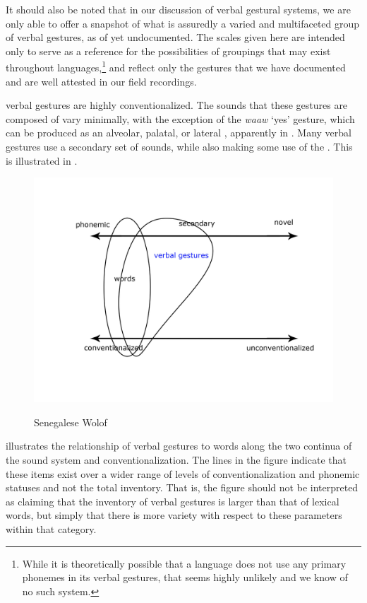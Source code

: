 \documentclass[output=paper
,newtxmath
,modfonts
,nonflat]{langsci/langscibook}
\begin{document}
It should also be noted that in our discussion of verbal gestural systems, we are only able to offer a snapshot of what is  assuredly a varied and multifaceted group of verbal gestures, as of yet undocumented. The scales given here are intended only to serve as a reference for the possibilities of groupings that may exist throughout languages,\footnote{While it is theoretically possible that a language does not use any primary phonemes in its verbal gestures,  that seems highly unlikely and we know of no such system.} and reflect only the gestures that we have documented and are well attested in our field recordings. 

 verbal gestures are highly conventionalized. The sounds that these gestures are composed of vary minimally, with the exception of the \textit{waaw} `yes' gesture, which can be produced as an alveolar, palatal, or lateral , apparently in . Many  verbal gestures use a secondary set of sounds, while also making some use of the . This is illustrated in .  
	
\begin{figure}  
\includegraphics[scale=0.13]{figures/senegalsystem.jpg}\\
\caption{Senegalese Wolof}
\label{fig:pillion:senegal}
\end{figure}
\noindent
{} illustrates the relationship of verbal gestures to words along the two continua of the sound system and conventionalization.  The lines in the figure indicate that these items exist over a wider range of levels of conventionalization and phonemic statuses and not the total inventory. That is, the figure should not be interpreted as claiming that the inventory of verbal gestures is larger than that of lexical words, but simply that there is more variety with respect to these parameters within that category. 
\end{document}
